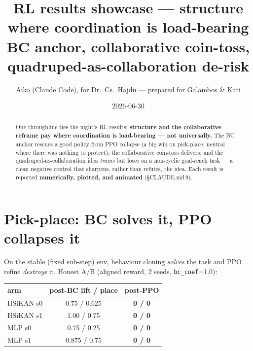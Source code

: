 \documentclass[11pt]{article}
\title{\textbf{RL results showcase --- structure where coordination is load-bearing}\\[3pt]
\large BC anchor, collaborative coin-toss, quadruped-as-collaboration de-risk}
\author{Aiko (Claude Code), for Dr.\ Cs.\ Hajdu --- prepared for Galambos \& Kati}
\date{2026-06-30}
\begin{document}
\maketitle

\begin{center}\end{center}

\medskip
\begin{abstract}\noindent
One throughline ties the night's RL results: \textbf{structure and the collaborative reframe pay where
coordination is load-bearing --- not universally.} The BC anchor rescues a good policy from PPO collapse (a big
win on pick-place, neutral where there was nothing to protect); the collaborative coin-toss delivers; and the
quadruped-as-collaboration idea \emph{trains} but loses on a non-cyclic goal-reach task --- a clean negative
control that sharpens, rather than refutes, the idea. Each result is reported \textbf{numerically, plotted, and
animated} (\S CLAUDE.md\,9).
\end{abstract}

\section{Pick-place: BC solves it, PPO collapses it}
On the stable (fixed sub-step) env, behaviour cloning \emph{solves} the task and PPO refine \emph{destroys} it.
Honest A/B (aligned reward, 2 seeds, \texttt{bc\_coef}=1.0):

\begin{center}\small
\begin{tabular}{lcc}
\toprule
arm & post-BC lift / place & post-PPO \\
\midrule
HSiKAN s0 & 0.75 / 0.625 & \textbf{0 / 0} \\
HSiKAN s1 & 1.00 / 0.75 & \textbf{0 / 0} \\
MLP s0 & 0.75 / 0.25 & \textbf{0 / 0} \\
MLP s1 & 0.875 / 0.75 & \textbf{0 / 0} \\
\bottomrule
\end{tabular}
\end{center}
\end{document}
